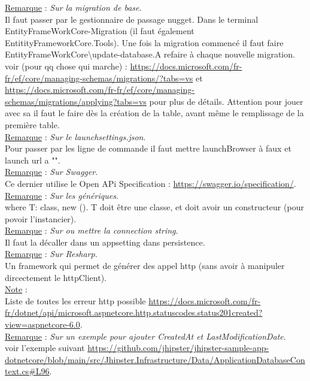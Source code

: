 \documentclass[a4paper,12pt,twoside]{article}
\newcommand{\rem}[2]{\noindent\underline{Remarque} : \textit{#1}.\\ \indent #2}
\newcommand{\note}[1]{\noindent\underline{Note} : \\ \indent #1}
\begin{document}
\rem{Sur la migration de base}{Il faut passer par le gestionnaire de passage nugget. Dans le terminal EntityFrameWorkCore\Add-Migration (il faut également EntitityFrameworkCore.Tools). Une fois la migration commencé il faut faire EntityFrameWorkCore\textbackslash update-database.A refaire à chaque nouvelle migration. voir (pour qq chose qui marche) : \url{https://docs.microsoft.com/fr-fr/ef/core/managing-schemas/migrations/?tabs=vs} et \url{https://docs.microsoft.com/fr-fr/ef/core/managing-schemas/migrations/applying?tabs=vs} pour plus de détails. Attention pour jouer avec sa il faut le faire dès la création de la table, avant même le remplissage de la première table.}\\

\rem{Sur le launchsettings.json}{Pour passer par les ligne de commande il faut mettre launchBrowser à faux et launch url a "".}\\

\rem{Sur Swagger}{Ce dernier utilise le Open APi Specification : \url{https://swagger.io/specification/}.}\\

\rem{Sur les génériques}{where T: class, new (). T doit être une classe, et doit avoir un constructeur (pour povoir l'instancier).}\\

\rem{Sur ou mettre la connection string}{Il faut la décaller dans un appsetting dans persistence.}\\

\rem{Sur Resharp}{Un framework qui permet de générer des appel http (sans avoir à manipuler dircectement le httpClient).}\\

\note{Liste de toutes les erreur http possible \url{https://docs.microsoft.com/fr-fr/dotnet/api/microsoft.aspnetcore.http.statuscodes.status201created?view=aspnetcore-6.0}.}\\

\rem{Sur un exemple pour ajouter CreatedAt et LastModificationDate}{voir l'exemple suivant \url{https://github.com/jhipster/jhipster-sample-app-dotnetcore/blob/main/src/Jhipster.Infrastructure/Data/ApplicationDatabaseContext.cs#L96}.}\\


\newpage
\printglossary[type=\acronymtype]%
\glsaddallunused %
\printglossary[type = main,nonumberlist]%
\end{document}
